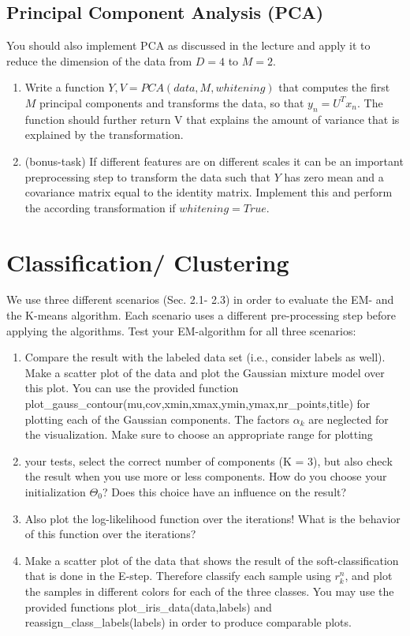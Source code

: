 \documentclass[a4paper]{article}
\begin{document}
\subsection{Principal Component Analysis (PCA)}
You should also implement PCA as discussed in the lecture and apply it to reduce the dimension of the data from $D = 4$ to $M = 2$.
\begin{enumerate}
  \item Write a function $Y,V = PCA(data, M, whitening)$ that computes the first $M$ principal components and transforms the data, so that $y_n = U^T x_n$. The function should further return V that explains the amount of variance that is explained by the transformation.
  \item (bonus-task) If different features are on different scales it can be an important preprocessing step to transform the data such that $Y$ has zero mean and a covariance matrix equal to the identity matrix. Implement this and perform the according transformation if $whitening = True$.
\end{enumerate}




\section{Classification/ Clustering}
We use three different scenarios (Sec. 2.1- 2.3) in order to evaluate the EM- and the K-means algorithm. Each scenario uses a different pre-processing step before applying the algorithms. Test your EM-algorithm for all three scenarios:

\begin{enumerate}
  \item Compare the result with the labeled data set (i.e., consider labels as well). Make a scatter plot of the data and plot the Gaussian mixture model over this plot. You can use the provided function plot\_gauss\_contour(mu,cov,xmin,xmax,ymin,ymax,nr\_points,title) for plotting each of the Gaussian components. The factors $\alpha_k$ are neglected for the visualization. Make sure to choose an appropriate range for plotting
  \item your tests, select the correct number of components (K = 3), but also check the result when you use more or less components. How do you choose your initialization $\Theta_0$? Does this choice have an influence on the result?
  \item Also plot the log-likelihood function over the iterations! What is the behavior of this function over the iterations?
  \item Make a scatter plot of the data that shows the result of the soft-classification that is done in the E-step. Therefore classify each sample using $r^n_k$, and plot the samples in different colors for each of the three classes. You may use the provided functions plot\_iris\_data(data,labels) and reassign\_class\_labels(labels) in order to produce comparable plots.
\end{enumerate}
\end{document}
